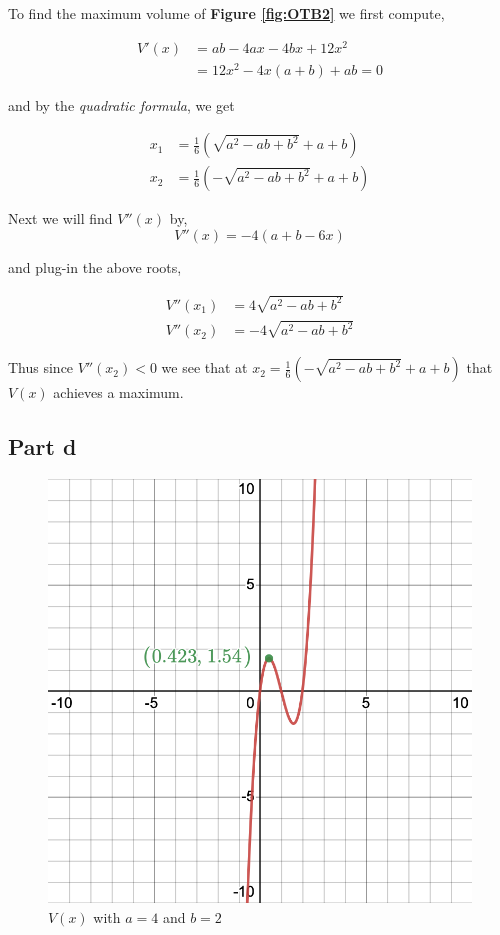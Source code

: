 \documentclass{article}
\begin{document}
To find the maximum volume of \textbf{Figure \ref{fig:OTB2}} we first compute,

\begin{align*}
    V'(x) &= ab - 4ax-4bx + 12x^2 \\ &= 12x^2 -4x(a+b) + ab = 0
\end{align*}

and by the \textit{quadratic formula}, we get

\begin{align*}
    x_1 &= \frac{1}{6}\left(\sqrt{a^2 - ab + b^2} + a + b\right) \\
    x_2 &= \frac{1}{6}\left(-\sqrt{a^2 - ab + b^2} + a + b\right)
\end{align*}

Next we will find $V''(x)$ by,
\begin{equation*}
    V''(x) = -4(a+b-6x)
\end{equation*}

and plug-in the above roots,

\begin{align*}
    V''(x_1) &= 4 \sqrt{a^2 - ab + b^2}\\
    V''(x_2) &= -4 \sqrt{a^2 - ab + b^2}
\end{align*}

Thus since $V''(x_2) < 0$ we see that at $x_2 = \frac{1}{6}\left(-\sqrt{a^2 - ab + b^2} + a + b\right)$ that $V(x)$ achieves a maximum.

\subsection*{Part d}
\begin{figure}[H]
    \centering
    \includegraphics[scale=0.3]{graph_b.png}
    \caption{$V(x)$ with $a = 4$ and $b = 2$}
    \label{fig:my_label}
\end{figure}
\end{document}
